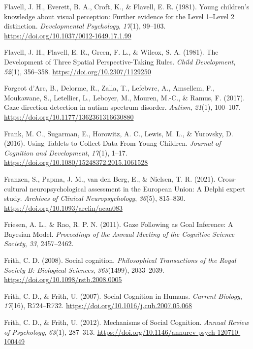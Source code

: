 \documentclass[
]{scrbook}
\newlength{\cslhangindent}
\newenvironment{CSLReferences}[2] %
 {\begin{list}{}{%
  \setlength{\itemindent}{0pt}
  \setlength{\leftmargin}{0pt}
  \setlength{\parsep}{0pt}
  \ifodd #1
   \setlength{\leftmargin}{\cslhangindent}
   \setlength{\itemindent}{-1\cslhangindent}
  \fi
  \setlength{\itemsep}{#2\baselineskip}}}
 {\end{list}}
\begin{document}
\begin{CSLReferences}{1}{0}
Flavell, J. H., Everett, B. A., Croft, K., \& Flavell, E. R. (1981). Young children's knowledge about visual perception: {Further} evidence for the {Level} 1--{Level} 2 distinction. \emph{Developmental Psychology}, \emph{17}(1), 99--103. \url{https://doi.org/10.1037/0012-1649.17.1.99}

Flavell, J. H., Flavell, E. R., Green, F. L., \& Wilcox, S. A. (1981). The {Development} of {Three Spatial Perspective-Taking Rules}. \emph{Child Development}, \emph{52}(1), 356--358. \url{https://doi.org/10.2307/1129250}

Forgeot d'Arc, B., Delorme, R., Zalla, T., Lefebvre, A., Amsellem, F., Moukawane, S., Letellier, L., Leboyer, M., Mouren, M.-C., \& Ramus, F. (2017). Gaze direction detection in autism spectrum disorder. \emph{Autism}, \emph{21}(1), 100--107. \url{https://doi.org/10.1177/1362361316630880}

Frank, M. C., Sugarman, E., Horowitz, A. C., Lewis, M. L., \& Yurovsky, D. (2016). Using {Tablets} to {Collect Data From Young Children}. \emph{Journal of Cognition and Development}, \emph{17}(1), 1--17. \url{https://doi.org/10.1080/15248372.2015.1061528}

Franzen, S., Papma, J. M., van den Berg, E., \& Nielsen, T. R. (2021). Cross-cultural neuropsychological assessment in the {European Union}: A {Delphi} expert study. \emph{Archives of Clinical Neuropsychology}, \emph{36}(5), 815--830. \url{https://doi.org/10.1093/arclin/acaa083}

Friesen, A. L., \& Rao, R. P. N. (2011). Gaze {Following} as {Goal Inference}: {A Bayesian Model}. \emph{Proceedings of the Annual Meeting of the Cognitive Science Society}, \emph{33}, 2457--2462.

Frith, C. D. (2008). Social cognition. \emph{Philosophical Transactions of the Royal Society B: Biological Sciences}, \emph{363}(1499), 2033--2039. \url{https://doi.org/10.1098/rstb.2008.0005}

Frith, C. D., \& Frith, U. (2007). Social {Cognition} in {Humans}. \emph{Current Biology}, \emph{17}(16), R724--R732. \url{https://doi.org/10.1016/j.cub.2007.05.068}

Frith, C. D., \& Frith, U. (2012). Mechanisms of {Social Cognition}. \emph{Annual Review of Psychology}, \emph{63}(1), 287--313. \url{https://doi.org/10.1146/annurev-psych-120710-100449}


\end{CSLReferences}
\end{document}
